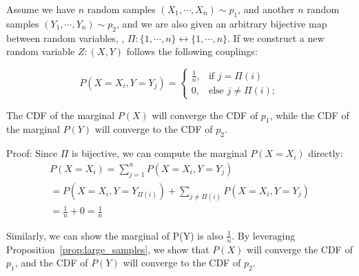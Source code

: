 \begin{proposition}\label{prop:ot}
Assume we have $n$ random samples $(X_1, \cdots, X_n) \sim p_1$, and another $n$ random samples $(Y_1, \cdots, Y_n) \sim p_2$, and we are also given an arbitrary bijective map between random variables, \ie, $\Pi: \{1, \cdots, n\} \leftrightarrow \{1, \cdots, n\}$.
%
If we construct a new random variable $Z : (X, Y)$ follows the following couplings:

\[
    P(X = X_i, Y = Y_j) =
    \begin{cases}
    \frac{1}{n}, & \text{if } j = \Pi(i) \\ 
        0, & \text{else } j \neq \Pi(i);
    \end{cases}
\]

The CDF of the marginal $P(X)$ will converge the CDF of $p_1$, while the CDF of the marginal $P(Y)$ will converge to the CDF of $p_2$.
\end{proposition}

Proof:
Since $\Pi$ is bijective, we can compute the marginal $P(X = X_i)$ directly:
\begin{equation}
    \begin{split}
            P(X = X_i) = \sum_{j=1}^{n} P(X = X_i, Y = Y_j) \\
            = P(X = X_i, Y = Y_{\Pi(i)}) + \sum_{j \neq \Pi(i)} P(X = X_i, Y = Y_j) \\
            = \frac{1}{n} + 0 = \frac{1}{n}
    \end{split}
\end{equation}

Similarly, we can show the marginal of P(Y) is also $\frac{1}{n}$.
%
By leveraging Proposition~\ref{prop:large_samples}, we show that $P(X)$ will converge the CDF of $p_1$, and the CDF of $P(Y)$ will converge to the CDF of $p_2$.


